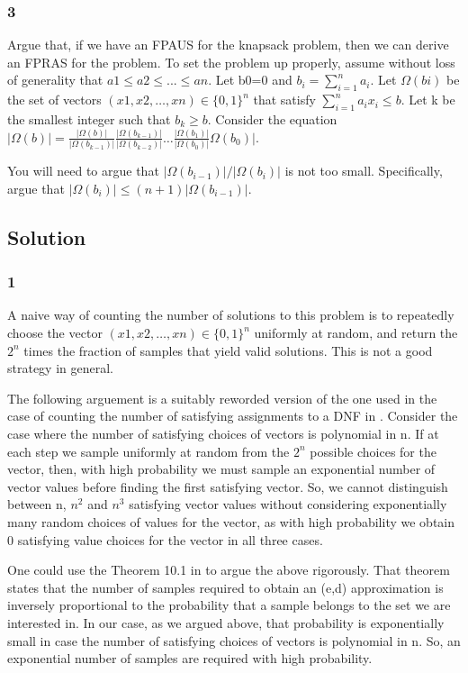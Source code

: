 \documentclass[10pt]{amsart}
\theoremstyle{remark}
\begin{document}
\subsubsection{3} Argue that, if we have an FPAUS for the knapsack problem, then we can derive an FPRAS for the problem. To set the problem up properly, assume without loss of generality that $a1\leq a2 \leq ... \leq an$. Let b0=0 and $b_{i}=\sum_{i=1}^{n}a_{i}$. Let $\Omega(bi)$ be the set of vectors $(x1, x2,\dots, xn)\in\{0, 1\}^{n}$ that satisfy $\sum_{i=1}^{n}a_{i}x_{i}\leq b$. Let k be the smallest integer such that $b_{k}\geq b$. Consider the equation
$|\Omega(b)|=\frac{|\Omega(b)|}{|\Omega(b_{k-1})|} \frac{|\Omega(b_{k-1})|}{|\Omega(b_{k-2})|} \dots \frac{|\Omega(b_{1})|}{|\Omega(b_{0})|}\Omega(b_{0})|$.

You will need to argue that $|\Omega(b_{i-1})|/|\Omega(b_{i})|$ is not too small. Specifically, argue that $|\Omega(b_{i})|\leq (n+1)|\Omega(b_{i-1})|$.

\subsection{Solution}

\subsubsection{1}
A naive way of counting the number of solutions to this problem is to repeatedly choose the vector $(x1, x2,\dots, xn)\in\{0, 1\}^{n}$ uniformly at random, and return the $2^{n}$ times the fraction of samples that yield valid solutions. This is not a good strategy in general. 

The following arguement is a suitably reworded version of the one used in the case of counting the number of satisfying assignments to a DNF in \cite{mitzenmacherUpfal}. Consider the case where the number of satisfying choices of vectors is polynomial in n. If at each step we sample uniformly at random from the $2^{n}$ possible choices for the vector, then, with high probability we must sample an exponential number of vector values before finding the first satisfying vector. So, we cannot distinguish between n, $n^{2}$ and $n^{3}$ satisfying vector values without considering exponentially many random choices of values for the vector, as with high probability we obtain 0 satisfying value choices for the vector in all three cases.

One could use the Theorem 10.1 in \cite{mitzenmacherUpfal} to argue the above rigorously. That theorem states that the number of samples required to obtain an (e,d) approximation is inversely proportional to the probability that a sample belongs to the set we are interested in. In our case, as we argued above, that probability is exponentially small in case the number of satisfying choices of vectors is polynomial in n. So, an exponential number of samples are required with high probability.
\end{document}
